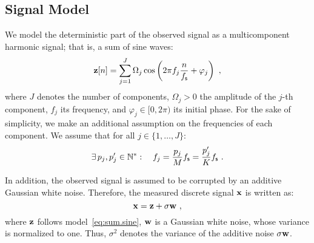\subsection{Signal Model}
We model the deterministic part of the observed signal as a multicomponent harmonic signal; that is, a sum of sine waves:
\begin{equation}
\bz[n]=\sum_{j=1}^J\Omega_j\cos\left(2\pi f_j \frac{n}{\fs} + \varphi_j\right)\ ,
\label{eq:sum.sine}
\end{equation}
where $J$ denotes the number of components, $\Omega_j>0$ the amplitude of the $j$-th component, $f_j$ its frequency, and $\varphi_j\in[0,2\pi)$ its initial phase.
%
For the sake of simplicity, we make an additional assumption on the frequencies of each component. We assume that for all $j\in\{1,\dots,J\}$:
\begin{equation}
\exists\, p_j,p_j'\in\mathbb N^*: \quad f_j = \dfrac{p_j}{M}f_{\mathsf s} = \dfrac{p'_j}{K}f_{\mathsf s}\ .
\end{equation}


In addition, the observed signal is assumed to be corrupted by an additive Gaussian white noise. Therefore, the measured discrete signal ${\mathbf x}$ is written as:
\begin{equation}
\bx = \bz + \sigma\bw\ ,
\label{eq:model.noise}
\end{equation}
where ${\mathbf z}$ follows model~\eqref{eq:sum.sine}, ${\mathbf w}$ is a Gaussian white noise, whose variance is normalized to one. Thus, $\sigma^2$ denotes the variance of the additive noise $\sigma{\mathbf w}$.

